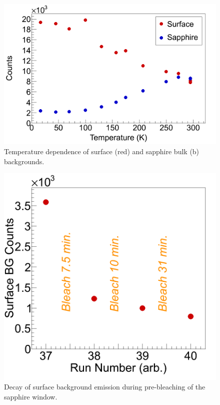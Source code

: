 



\begin{figure} %
        \centering
                \includegraphics[width=.6\textwidth]{figures/bg_temp_dep.png}
                \caption{Temperature dependence of surface (red) and sapphire bulk (b) backgrounds.}
\label{fig:BGtempDependence}
\end{figure}

\begin{figure} %
        \centering
                \includegraphics[width=.4\textwidth]{figures/Bleach_SurfaceBG_20150807_part1.png}
                \caption{Decay of surface background emission during pre-bleaching of the sapphire window.}
\label{fig:surfBGbleach}
\end{figure}


